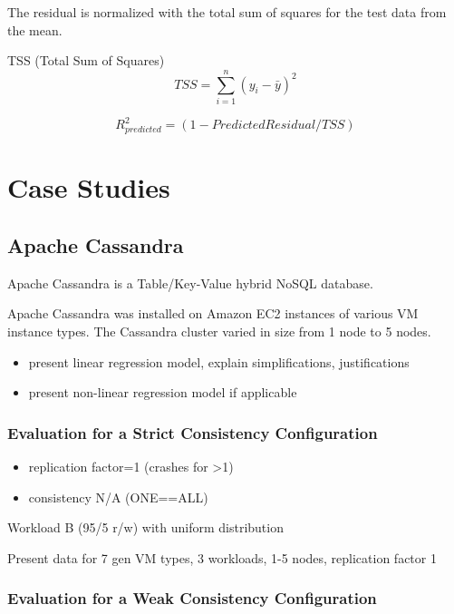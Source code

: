 \documentclass{acm_proc_article-sp}
\begin{document}
The residual is normalized with the total sum of squares for the test data from the mean.

\begin{definition}
TSS (Total Sum of Squares)
\begin{displaymath}{
TSS=\sum_{i=1}^{n} (y_i - \bar{y})^{2}
}\end{displaymath}

\begin{displaymath}{
R_{predicted}^2 = (1 - PredictedResidual/TSS)
}\end{displaymath}
\end{definition}

 \section{Case Studies}

\subsection{Apache Cassandra}

Apache Cassandra is a Table/Key-Value hybrid NoSQL database.

Apache Cassandra was installed on Amazon EC2 instances of various VM instance types. The Cassandra cluster varied in size from 1 node to 5 nodes.

\begin{itemize}
   \item present linear regression model, explain simplifications, justifications
   \item present non-linear regression model if applicable
\end{itemize}

\subsubsection{Evaluation for a Strict Consistency Configuration}

\begin{itemize}
\item replication factor=1 (crashes for >1)
\item consistency N/A (ONE==ALL)
\end{itemize}
Workload B (95/5 r/w) with uniform distribution

Present data for
7 gen VM types, 3 workloads, 1-5 nodes, replication factor 1

\subsubsection{Evaluation for a Weak Consistency Configuration}
\end{document}
